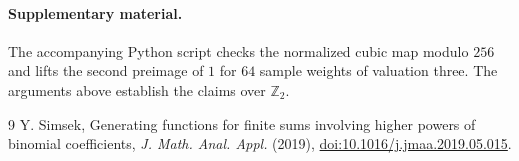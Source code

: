 \documentclass[11pt]{article}
\newcommand{\Z}{\mathbb Z_2}
\begin{document}
\paragraph{Supplementary material.}
The accompanying Python script checks the normalized cubic map modulo $256$ and lifts the second preimage of $1$ for $64$ sample weights of valuation three. The arguments above establish the claims over $\Z$.

\begin{thebibliography}{9}
 Y. Simsek, Generating functions for finite sums involving higher powers of binomial coefficients, \emph{J. Math. Anal. Appl.} (2019), \href{https://doi.org/10.1016/j.jmaa.2019.05.015}{doi:10.1016/j.jmaa.2019.05.015}.
\end{thebibliography}
\end{document}
